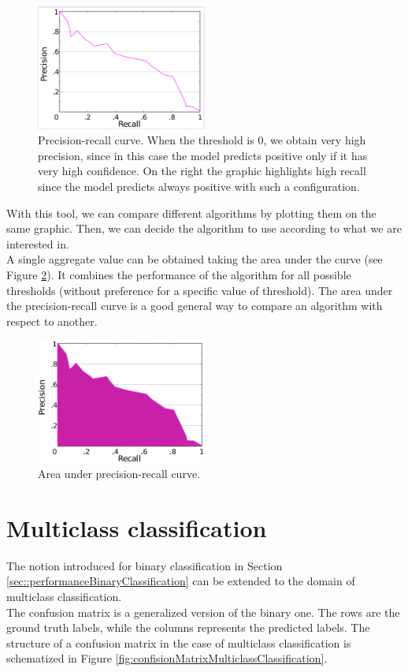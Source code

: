 \begin{figure}[H]
	\centering
	\includegraphics[width=0.5\textwidth]{
		images/06_Evaluation_precisionRecallCurve.png
	}
	\caption{Precision-recall curve. When the threshold is 0, we obtain very high
	precision, since in this case the model predicts positive only if it has very high
	confidence. On the right the graphic highlights high recall since the model
	predicts always positive with such a configuration.}
	\label{fig:precisionRecallCurve}
\end{figure}

With this tool, we can compare different algorithms by plotting them on the same
graphic. Then, we can decide the algorithm to use according to what we are
interested in.\\ A single aggregate value can be obtained taking the area under
the curve (see Figure \ref{fig:areaUnderPreRecCurve}). It combines the performance
of the algorithm for all possible thresholds (without preference for a specific
value of threshold). The area under the precision-recall curve is a good general
way to compare an algorithm with respect to another.

\begin{figure}[H]
	\centering
	\includegraphics[width=0.5\textwidth]{
		images/06_Evaluation_areaPrecisionRecallCurve.png
	}
	\caption{Area under precision-recall curve.}
	\label{fig:areaUnderPreRecCurve}
\end{figure}

\section{Multiclass classification}
\label{sec::performanceMulticlassClassification} The notion introduced for binary
classification in Section \ref{sec::performanceBinaryClassification} can be extended
to the domain of multiclass classification.\\ The confusion matrix is a generalized
version of the binary one. The rows are the ground truth labels, while the columns
represents the predicted labels. The structure of a confusion matrix in the case
of multiclass classification is schematized in Figure
\ref{fig:confisionMatrixMulticlassClassification}.


